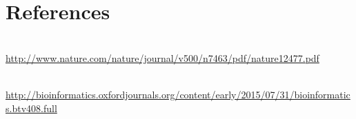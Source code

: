
\section{References}

\begin{description}[style=multiline,labelindent=0cm,align=left,leftmargin=1cm]
 \item[Alexandrov et al. Nature 2013] \hfill\\
  \url{http://www.nature.com/nature/journal/v500/n7463/pdf/nature12477.pdf}
 \item[Gehring et al. Bioinformatics 2015] \hfill\\
  \url{http://bioinformatics.oxfordjournals.org/content/early/2015/07/31/bioinformatics.btv408.full}
\end{description}
